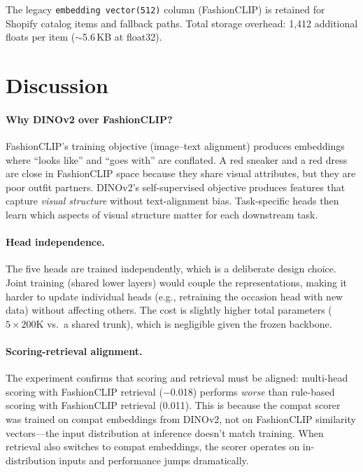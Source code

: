 \documentclass[10pt,twocolumn]{article}
\begin{document}
The legacy \texttt{embedding vector(512)} column (FashionCLIP) is
retained for Shopify catalog items and fallback paths.  Total storage
overhead: 1,412 additional floats per item ($\sim$5.6\,KB at float32).

\section{Discussion}
\label{sec:discussion}

\paragraph{Why DINOv2 over FashionCLIP?}
FashionCLIP's training objective (image--text alignment) produces
embeddings where ``looks like'' and ``goes with'' are conflated.  A red
sneaker and a red dress are close in FashionCLIP space because they share
visual attributes, but they are poor outfit partners.  DINOv2's
self-supervised objective produces features that capture \emph{visual
structure} without text-alignment bias.  Task-specific heads then learn
which aspects of visual structure matter for each downstream task.

\paragraph{Head independence.}
The five heads are trained independently, which is a deliberate design
choice.  Joint training (shared lower layers) would couple the
representations, making it harder to update individual heads (e.g.,
retraining the occasion head with new data) without affecting others.
The cost is slightly higher total parameters ($5 \times 200\text{K}$
vs.\ a shared trunk), which is negligible given the frozen backbone.

\paragraph{Scoring-retrieval alignment.}
The experiment confirms that scoring and retrieval must be aligned:
multi-head scoring with FashionCLIP retrieval ($-$0.018) performs
\emph{worse} than rule-based scoring with FashionCLIP retrieval (0.011).
This is because the compat scorer was trained on compat embeddings from
DINOv2, not on FashionCLIP similarity vectors---the input distribution
at inference doesn't match training.  When retrieval also switches to
compat embeddings, the scorer operates on in-distribution inputs and
performance jumps dramatically.
\end{document}
